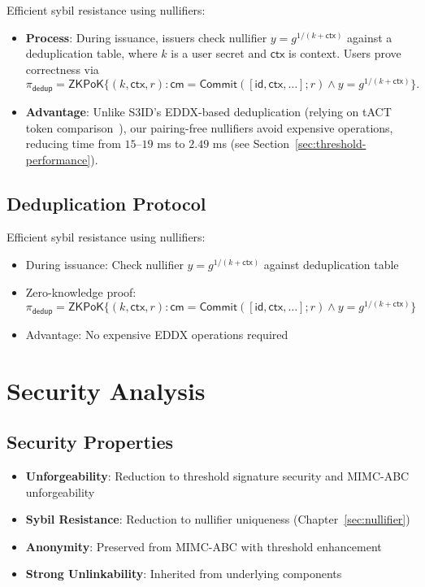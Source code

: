 Efficient sybil resistance using nullifiers:
\begin{itemize}
    \item \textbf{Process}: During issuance, issuers check nullifier $y = g^{1/(k + \mathsf{ctx})}$ against a deduplication table, where $k$ is a user secret and $\mathsf{ctx}$ is context. Users prove correctness via
    \[
    \pi_{\mathsf{dedup}} = \mathsf{ZKPoK}\{(k, \mathsf{ctx}, r) : \mathsf{cm} = \mathsf{Commit}([\mathsf{id}, \mathsf{ctx}, \ldots]; r) \land y = g^{1/(k + \mathsf{ctx})}\}.
    \]
    \item \textbf{Advantage}: Unlike S3ID's EDDX-based deduplication (relying on tACT token comparison~\cite{rabaninejad_attribute-based_2024}), our pairing-free nullifiers avoid expensive operations, reducing time from $15$–$19$ ms to $2.49$ ms (see Section~\ref{sec:threshold-performance}).
\end{itemize}














\subsection{Deduplication Protocol}
Efficient sybil resistance using nullifiers:
\begin{itemize}
    \item During issuance: Check nullifier $y = g^{1/(k + \mathsf{ctx})}$ against deduplication table
    \item Zero-knowledge proof: $\pi_{\mathsf{dedup}} = \mathsf{ZKPoK}\{(k, \mathsf{ctx}, r) : \mathsf{cm} = \mathsf{Commit}([\mathsf{id}, \mathsf{ctx}, \ldots]; r) \land y = g^{1/(k + \mathsf{ctx})}\}$
    \item Advantage: No expensive EDDX operations required
\end{itemize}

\section{Security Analysis}
\label{sec:threshold-security}

\subsection{Security Properties}
\begin{itemize}
    \item \textbf{Unforgeability}: Reduction to threshold signature security and MIMC-ABC unforgeability
    \item \textbf{Sybil Resistance}: Reduction to nullifier uniqueness (Chapter~\ref{sec:nullifier})
    \item \textbf{Anonymity}: Preserved from MIMC-ABC with threshold enhancement
    \item \textbf{Strong Unlinkability}: Inherited from underlying components
\end{itemize}

